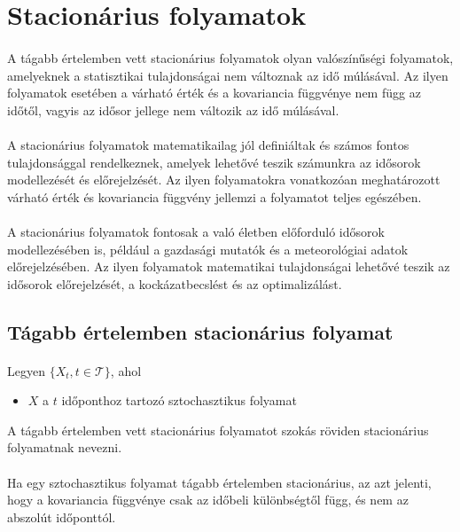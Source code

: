 \documentclass[11pt,a4paper]{article}
\begin{document}
		\section{Stacionárius folyamatok}
			\paragraph{}
				A tágabb értelemben vett stacionárius folyamatok olyan valószínűségi folyamatok, amelyeknek a statisztikai tulajdonságai nem változnak az idő múlásával. Az ilyen folyamatok esetében a várható érték és a kovariancia függvénye nem függ az időtől, vagyis az idősor jellege nem változik az idő múlásával.
			\paragraph{}
				A stacionárius folyamatok matematikailag jól definiáltak és számos fontos tulajdonsággal rendelkeznek, amelyek lehetővé teszik számunkra az idősorok modellezését és előrejelzését. Az ilyen folyamatokra vonatkozóan meghatározott várható érték és kovariancia függvény jellemzi a folyamatot teljes egészében. 
			\paragraph{}
				A stacionárius folyamatok fontosak a való életben előforduló idősorok modellezésében is, például a gazdasági mutatók és a meteorológiai adatok előrejelzésében. Az ilyen folyamatok matematikai tulajdonságai lehetővé teszik az idősorok előrejelzését, a kockázatbecslést és az optimalizálást. 
			\subsection{Tágabb értelemben stacionárius folyamat}
				\paragraph{}
					Legyen $\{X_t, t \in \mathcal{T}\}$, ahol
					\begin{itemize}
						\item $X$ a $t$ időponthoz tartozó sztochasztikus folyamat
					\end{itemize}
					A tágabb értelemben vett stacionárius folyamatot szokás röviden stacionárius folyamatnak nevezni.
				\paragraph{}
					Ha egy sztochasztikus folyamat tágabb értelemben stacionárius, az azt jelenti, hogy a  kovariancia függvénye csak az időbeli különbségtől függ, és nem az abszolút időponttól.
\end{document}

